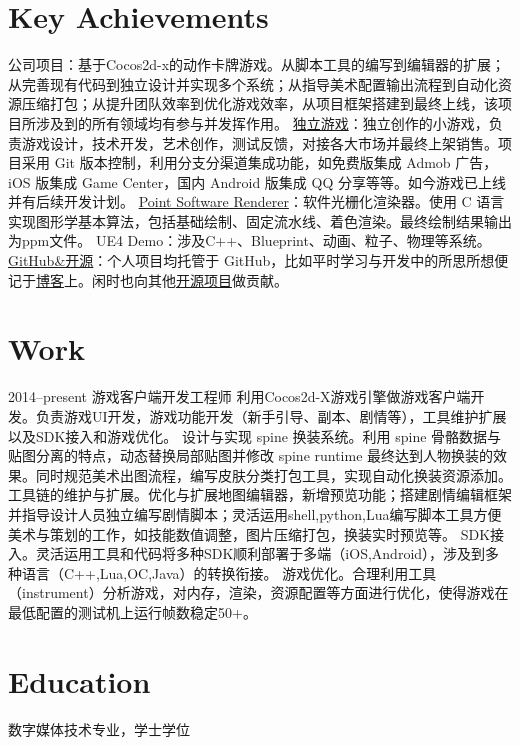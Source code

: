 \documentclass[full]{rvca}
\begin{document}
\section{Key Achievements}

\achievements
{公司项目：基于Cocos2d-x的动作卡牌游戏。从脚本工具的编写到编辑器的扩展；从完善现有代码到独立设计并实现多个系统；从指导美术配置输出流程到自动化资源压缩打包；从提升团队效率到优化游戏效率，从项目框架搭建到最终上线，该项目所涉及到的所有领域均有参与并发挥作用。}
{\href{http://a.app.qq.com/o/simple.jsp?pkgname=com.kode.Thirteen}{独立游戏}：独立创作的小游戏，负责游戏设计，技术开发，艺术创作，测试反馈，对接各大市场并最终上架销售。项目采用 Git 版本控制，利用分支分渠道集成功能，如免费版集成 Admob 广告，iOS 版集成 Game Center，国内 Android 版集成 QQ 分享等等。如今游戏已上线并有后续开发计划。}
{\href{https://github.com/keyring/point}{Point Software Renderer}：软件光栅化渲染器。使用 C 语言实现图形学基本算法，包括基础绘制、固定流水线、着色渲染。最终绘制结果输出为ppm文件。}
{UE4 Demo：涉及C++、Blueprint、动画、粒子、物理等系统。}
{\href{http://github.com/keyring}{GitHub\&开源}：个人项目均托管于 GitHub，比如平时学习与开发中的所思所想便记于\href{http://www.photoneray.com}{博客}上。闲时也向其他\href{https://github.com/cloudwu/lua53doc/graphs/contributors}{开源项目}做贡献。}
{}

\section{Work}


{2014--present}%
{游戏客户端开发工程师} %
{利用Cocos2d-X游戏引擎做游戏客户端开发。负责游戏UI开发，游戏功能开发（新手引导、副本、剧情等），工具维护扩展以及SDK接入和游戏优化。}%
{设计与实现 spine 换装系统。利用 spine 骨骼数据与贴图分离的特点，动态替换局部贴图并修改 spine runtime 最终达到人物换装的效果。同时规范美术出图流程，编写皮肤分类打包工具，实现自动化换装资源添加。}
{工具链的维护与扩展。优化与扩展地图编辑器，新增预览功能；搭建剧情编辑框架并指导设计人员独立编写剧情脚本；灵活运用shell,python,Lua编写脚本工具方便美术与策划的工作，如技能数值调整，图片压缩打包，换装实时预览等。}
{SDK接入。灵活运用工具和代码将多种SDK顺利部署于多端（iOS,Android），涉及到多种语言（C++,Lua,OC,Java）的转换衔接。}
{游戏优化。合理利用工具（instrument）分析游戏，对内存，渲染，资源配置等方面进行优化，使得游戏在最低配置的测试机上运行帧数稳定50+。}
{}

\section{Education}

数字媒体技术专业，学士学位
\end{document}
